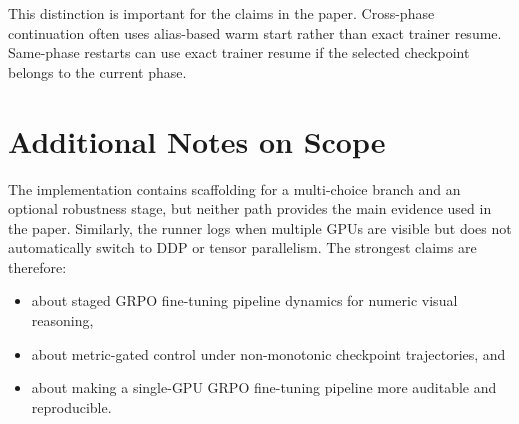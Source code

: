 \documentclass{article} %
\begin{document}
This distinction is important for the claims in the paper. Cross-phase continuation often uses alias-based warm start rather than exact trainer resume. Same-phase restarts can use exact trainer resume if the selected checkpoint belongs to the current phase.

\section{Additional Notes on Scope}

The implementation contains scaffolding for a multi-choice branch and an optional robustness stage, but neither path provides the main evidence used in the paper. Similarly, the runner logs when multiple GPUs are visible but does not automatically switch to DDP or tensor parallelism. The strongest claims are therefore:
\begin{itemize}[leftmargin=1.2em]
\item about staged GRPO fine-tuning pipeline dynamics for numeric visual reasoning,
\item about metric-gated control under non-monotonic checkpoint trajectories, and
\item about making a single-GPU GRPO fine-tuning pipeline more auditable and reproducible.
\end{itemize}
\end{document}
